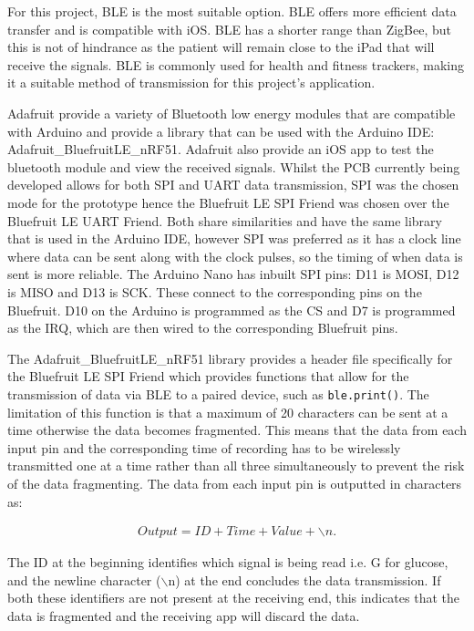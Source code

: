 For this project, BLE is the most suitable option. BLE offers more efficient data transfer and is compatible with iOS. BLE has a shorter range than ZigBee, but this is not of hindrance as the patient will remain close to the iPad that will receive the signals. BLE is commonly used for health and fitness trackers, making it a suitable method of transmission for this project's application.

Adafruit provide a variety of Bluetooth low energy modules that are compatible with Arduino and provide a library that can be used with the Arduino IDE: Adafruit\_BluefruitLE\_nRF51. Adafruit also provide an iOS app to test the bluetooth module and view the received signals. Whilst the PCB currently being developed allows for both SPI and UART data transmission, SPI was the chosen mode for the prototype hence the Bluefruit LE SPI Friend was chosen over the Bluefruit LE UART Friend. Both share similarities and have the same library that is used in the Arduino IDE, however SPI was preferred as it has a clock line where data can be sent along with the clock pulses, so the timing of when data is sent is more reliable. The Arduino Nano has inbuilt SPI pins: D11 is MOSI, D12 is MISO and D13 is SCK. These connect to the corresponding pins on the Bluefruit. D10 on the Arduino is programmed as the CS and D7 is programmed as the IRQ, which are then wired to the corresponding Bluefruit pins. 

The Adafruit\_BluefruitLE\_nRF51 library provides a header file specifically for the Bluefruit LE SPI Friend which provides functions that allow for the transmission of data via BLE to a paired device, such as {\tt{ble.print()}}. The limitation of this function is that a maximum of 20 characters can be sent at a time otherwise the data becomes fragmented. This means that the data from each input pin and the corresponding time of recording has to be wirelessly transmitted one at a time rather than all three simultaneously to prevent the risk of the data fragmenting. The data from each input pin is outputted in characters as:

\begin{align}
    Output = ID + Time + Value + \backslash n.
    \nonumber
\end{align}

The ID at the beginning identifies which signal is being read i.e. G for glucose, and the newline character ($\backslash$n) at the end concludes the data transmission. If both these identifiers are not present at the receiving end, this indicates that the data is fragmented and the receiving app will discard the data. 


